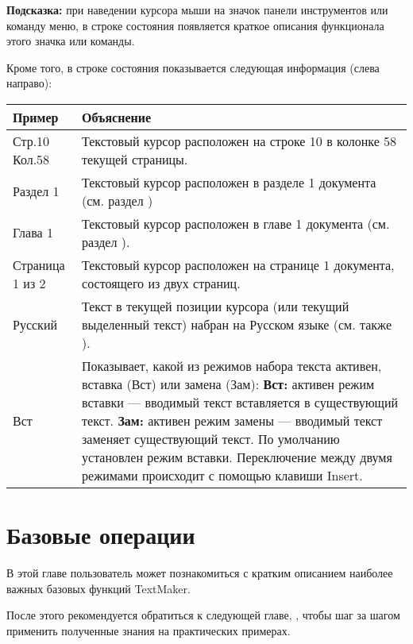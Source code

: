 ﻿\documentclass[a4paper,10pt]{article}
\begin{document}
\begin{mdframed}[backgroundcolor=blue!10]
\textbf{Подсказка:} при наведении курсора мыши на значок панели инструментов или команду меню, в строке состояния появляется краткое описания функционала этого значка или команды. 
\end{mdframed}

Кроме того, в строке состояния показывается следующая информация (слева направо):

\begin{center}
\begin{tabular}{ | m{4cm} | m{10cm} | }
\hline
 \textbf{Пример} & \textbf{Объяснение} \\ 
 \hline
 Стр.10 Кол.58 & Текстовый курсор расположен на строке 10 в колонке 58 текущей страницы. \\  
 \hline
 Раздел 1 & Текстовый курсор расположен в разделе 1 документа (см. раздел \nameref{sec:многразмстр}) \\
 \hline
 Глава 1 & Текстовый курсор расположен в главе 1 документа (см. раздел \nameref{sec:разелдокнаглавы}). \\
 \hline
 Страница 1 из 2 & Текстовый курсор расположен на странице 1 документа, состоящего из двух страниц. \\
 \hline
 Русский & Текст в текущей позиции курсора (или текущий выделенный текст) набран на Русском языке (см. также \nameref{sec:установкаязыка}).\\
 \hline
 Вст & Показывает, какой из режимов набора текста активен, вставка (Вст) или замена (Зам):
\textbf{Вст:} активен режим вставки — вводимый текст вставляется в существующий текст.
\textbf{Зам:} активен режим замены — вводимый текст заменяет существующий текст.
По умолчанию установлен режим вставки. Переключение между двумя режимами происходит с помощью клавиши Insert.\\
\hline
\end{tabular}
\end{center}

\section{Базовые операции} \label{sec:бо}
В этой главе пользователь может познакомиться с кратким описанием наиболее важных базовых функций TextMaker. 

После этого рекомендуется обратиться к следующей главе, , чтобы шаг за шагом применить полученные знания на практических примерах.
\end{document}
